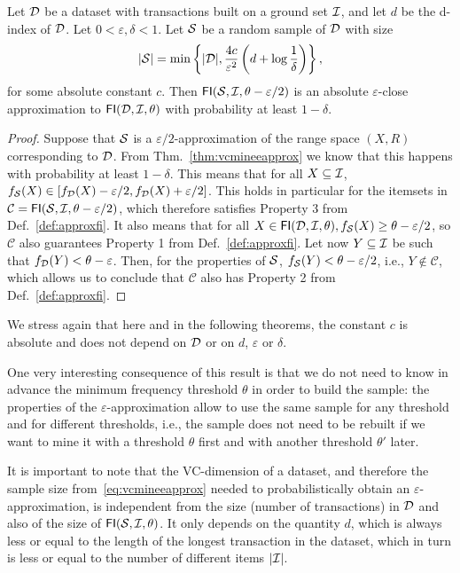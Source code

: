 \begin{lemma}\label{lem:absapproxfi}
  Let ${\cal D}$ be a dataset with transactions built on a ground set ${\cal I}$, and let
  $d$ be the d-index of ${\cal D}$. Let
  $0<\varepsilon,\delta<1$. Let ${\cal S}$ be a random sample of ${\cal D}$ with size 
  \[
  |{\cal S}|=\min\left\{|{\cal D}|,\frac{4c}{\varepsilon^2}\left(d+\log\frac{1}{\delta}\right)\right\},\]
  for some absolute constant $c$. Then $\mathsf{FI}({\cal S},{\cal I},\theta-\varepsilon/2)$ is an absolute
  $\varepsilon$-close approximation to $\mathsf{FI}({\cal D},{\cal I},\theta)$ with probability
  at least $1-\delta$.
\end{lemma}

\begin{proof}
  Suppose that ${\cal S}$ is a $\varepsilon/2$-approximation of the range space $(X,R)$ corresponding
  to ${\cal D}$. From Thm.~\ref{thm:vcmineeapprox} we know that this happens with probability at least $1-\delta$.  
  This means that for all $X\subseteq{\cal I}$,
  $f_{\cal S}(X)\in[f_{\cal D}(X)-\varepsilon/2,f_{\cal D}(X)+\varepsilon/2]$.
  This holds in particular for the itemsets in
  $\mathcal{C}=\mathsf{FI}({\cal S},{\cal I},\theta-\varepsilon/2)$, which therefore satisfies
  Property 3 from Def.~\ref{def:approxfi}. It also means that for all $X\in\mathsf{FI}({\cal D},{\cal I},\theta),
  f_{\cal S}(X)\ge \theta-\varepsilon/2$, so $\mathcal{C}$ also guarantees Property
  1 from Def.~\ref{def:approxfi}. Let now $Y\subseteq{\cal I}$ be such that
  $f_{\cal D}(Y)< \theta-\varepsilon$. Then, for the properties of ${\cal S}$,
  $f_{\cal S}(Y)<\theta-\varepsilon/2$, i.e., $Y\notin \mathcal{C}$, which allows us
  to conclude that $\mathcal{C}$ also has Property 2 from Def.~\ref{def:approxfi}.
\end{proof}

We stress again that here and in the following theorems, the constant $c$ is
absolute and does not depend on ${\cal D}$ or on $d$, $\varepsilon$ or $\delta$.

One very interesting consequence of this result is that we do not need to know in advance
the minimum frequency threshold $\theta$ in order to build the sample: the
properties of the $\varepsilon$-approximation allow to use the same sample
for any threshold and for different thresholds, i.e., the sample does not need
to be rebuilt if we want to mine it with a threshold $\theta$ first and with
another threshold $\theta'$ later.

It is important to note that the VC-dimension of a dataset, and therefore the
sample size from~\eqref{eq:vcmineeapprox} needed to probabilistically obtain an
$\varepsilon$-approximation, is independent from the size (number of
transactions) in ${\cal D}$ and also of the size of $\mathsf{FI}({\cal S},{\cal I},\theta)$. It
only depends on the quantity $d$, which is always less or equal to the length
of the longest transaction in the dataset, which in turn is less or equal to the
number of different items $|{\cal I}|$.


